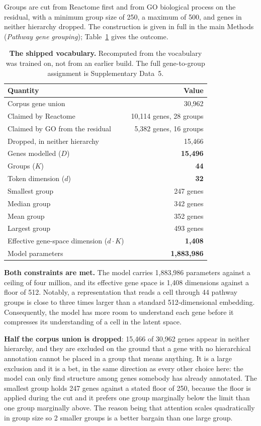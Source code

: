 Groups are cut from Reactome first and from GO biological process on the
residual, with a minimum group size of 250, a maximum of 500, and genes in
neither hierarchy dropped. The construction is given in full in
the main Methods (\emph{Pathway gene grouping}); Table~\ref{stab:vocabulary} gives the outcome.

\begin{table}[t]
\centering
\caption[The shipped vocabulary]{\textbf{The shipped vocabulary.} Recomputed
from the vocabulary \elaj{} was trained on, not from an earlier build. The
full gene-to-group assignment is Supplementary Data~5.}
\label{stab:vocabulary}
\small
\begin{tabular}{@{}lr@{}}
\toprule
Quantity & Value \\
\midrule
Corpus gene union & 30{,}962 \\
Claimed by Reactome & 10{,}114 genes, 28 groups \\
Claimed by GO from the residual & 5{,}382 genes, 16 groups \\
Dropped, in neither hierarchy & 15{,}466 \\
\midrule
Genes modelled ($D$) & \textbf{15{,}496} \\
Groups ($K$) & \textbf{44} \\
Token dimension ($d$) & \textbf{32} \\
\midrule
Smallest group & 247 genes \\
Median group & 342 genes \\
Mean group & 352 genes \\
Largest group & 493 genes \\
\midrule
Effective gene-space dimension ($d \cdot K$) & \textbf{1{,}408} \\
Model parameters & \textbf{1{,}883{,}986} \\
\bottomrule
\end{tabular}
\end{table}

\textbf{Both constraints are met.} The model carries 1{,}883{,}986 parameters 
against a ceiling of four million, and its effective gene space is 1{,}408 
dimensions against a floor of 512. Notably, a representation that reads a cell
through 44 pathway groups is close to three times larger than a standard 
512-dimensional embedding. Consequently, the model has more room to understand 
each gene before it compresses its understanding of a cell in the latent space.

\textbf{Half the corpus union is dropped}: 15{,}466 of 30{,}962 genes
appear in neither hierarchy, and they are excluded on the ground that a gene
with no hierarchical annotation cannot be placed in a group that means
anything. It is a large exclusion and it is a bet, in the same direction as
every other choice here: the model can only find structure among genes somebody
has already annotated. The smallest group holds 247 genes against a
stated floor of 250, because the floor is applied during the cut and it prefers
one group marginally below the limit than one group marginally above. The 
reason being that attention scales quadratically in group size so 2 smaller 
groups is a better bargain than one large group.

